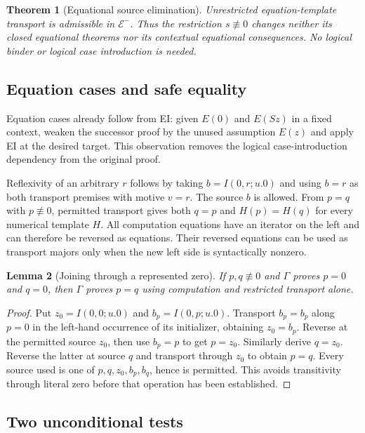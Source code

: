 \documentclass[11pt,letterpaper]{article}
\newtheorem{theorem}{Theorem}[section]
\newtheorem{lemma}[theorem]{Lemma}
\theoremstyle{definition}
\newcommand{\EE}{\mathcal E^{-}}
\newcommand{\synneq}{\not\equiv}
\begin{document}
\begin{theorem}[Equational source elimination]
\label{thm:equational}
Unrestricted equation-template transport is admissible in $\EE$. Thus the
restriction $s\synneq0$ changes neither its closed equational theorems nor
its contextual equational consequences. No logical binder or logical case
introduction is needed.
\end{theorem}

\subsection{Equation cases and safe equality}

Equation cases already follow from EI: given $E(0)$ and $E(Sz)$ in a fixed
context, weaken the successor proof by the unused assumption $E(z)$ and
apply EI at the desired target. This observation removes the logical
case-introduction dependency from the original proof.

Reflexivity of an arbitrary $r$ follows by taking $b=I(0,r;u.0)$ and
using $b=r$ as both transport premises with motive $v=r$. The source $b$
is allowed. From $p=q$ with $p\synneq0$, permitted transport gives both
$q=p$ and $H(p)=H(q)$ for every numerical template $H$. All computation
equations have an iterator on the left and can therefore be reversed as
equations. Their reversed equations can be used as transport majors only
when the new left side is syntactically nonzero.

\begin{lemma}[Joining through a represented zero]
If $p,q\synneq0$ and $\Gamma$ proves $p=0$ and $q=0$, then $\Gamma$
proves $p=q$ using computation and restricted transport alone.
\end{lemma}
\begin{proof}
Put $z_0=I(0,0;u.0)$ and $b_p=I(0,p;u.0)$. Transport $b_p=b_p$
along $p=0$ in the left-hand occurrence of its initializer, obtaining
$z_0=b_p$. Reverse at the permitted source $z_0$, then use $b_p=p$
to get $p=z_0$. Similarly derive $q=z_0$. Reverse the latter at source
$q$ and transport through $z_0$ to obtain $p=q$. Every source used is
one of $p,q,z_0,b_p,b_q$, hence is permitted. This avoids transitivity
through literal zero before that operation has been established.
\end{proof}

\subsection{Two unconditional tests}
\end{document}
